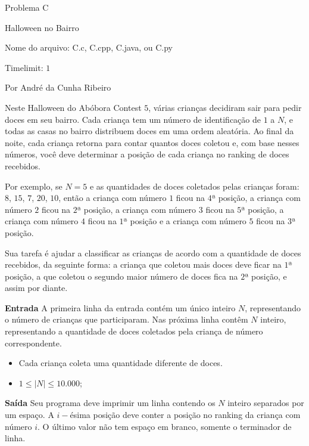 \begin{center}
Problema C

Halloween no Bairro

{\small Nome do arquivo: C.c, C.cpp, C.java, ou C.py}

{\large Timelimit: $1$}

{\tiny Por André da Cunha Ribeiro}

\end{center}			
			
Neste Halloween do Abóbora Contest $5$, várias crianças decidiram sair para pedir doces em seu bairro. Cada criança tem um número de identificação de $1$ a $N$, e todas as casas no bairro distribuem doces em uma ordem aleatória. Ao final da noite, cada criança retorna para contar quantos doces coletou e, com base nesses números, você deve determinar a posição de cada criança no ranking de doces recebidos.

Por exemplo, se $N = 5$ e as quantidades de doces coletados pelas crianças foram: $8$, $15$, $7$, $20$, $10$, então a criança com número $1$ ficou na $4$ª posição, a criança com número $2$ ficou na $2$ª posição, a criança com número $3$ ficou na $5$ª posição, a criança com número $4$ ficou na $1$ª posição e a criança com número $5$ ficou na $3$ª posição.

Sua tarefa é ajudar a classificar as crianças de acordo com a quantidade de doces recebidos, da seguinte forma: a criança que coletou mais doces deve ficar na $1$ª posição, a que coletou o segundo maior número de doces fica na $2$ª posição, e assim por diante.

\vspace{0.3cm}
\textbf{Entrada}
A primeira linha da entrada contém um único inteiro $N$, representando o número de crianças que participaram. Nas próxima linha contêm $N$ inteiro, representando a quantidade de doces coletados pela criança de número correspondente.
\begin{itemize}
    \item Cada criança coleta uma quantidade diferente de doces.
\end{itemize}
\begin{itemize}
\item $1 \leqslant |N| \leqslant 10.000$;
\end{itemize}

\vspace{0.3cm}
\textbf{Saída}
Seu programa deve imprimir um linha contendo os $N$ inteiro separados por um espaço. A $i-$ésima posição deve conter a posição no ranking da criança com número $i$. O último valor não tem espaço em branco, somente o terminador de linha.

